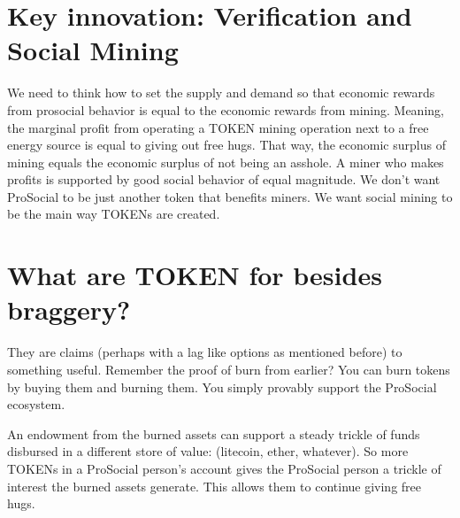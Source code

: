 \documentclass[12pt]{article}
\begin{document}
\section{\textbf{Key innovation}: Verification and Social Mining}
We need to think how to set the supply and demand so that economic rewards from prosocial behavior is equal to the economic rewards from mining. Meaning, the marginal profit from operating a TOKEN mining operation next to a free energy source is equal to giving out free hugs. That way, the economic surplus of mining equals the economic surplus of not being an asshole. A miner who makes profits is supported by good social behavior of equal magnitude. We don't want ProSocial to be just another token that benefits miners. We want social mining to be the main way TOKENs are created.

\section*{What are TOKEN for besides braggery?}
They are claims (perhaps with a lag like options as mentioned before) to something useful. Remember the proof of burn from earlier? You can burn tokens by buying them and burning them. You simply provably support the ProSocial ecosystem. 

An endowment from the burned assets can support a steady trickle of funds disbursed in a different store of value: (litecoin, ether, whatever). So more TOKENs in a ProSocial person's account gives the ProSocial person a trickle of interest the burned assets generate. This allows them to continue giving free hugs.
\end{document}
